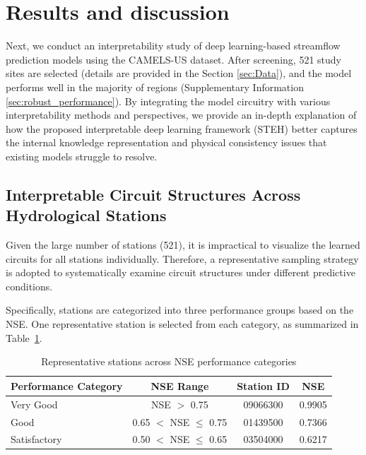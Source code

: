 \section{Results and discussion}
Next, we conduct an interpretability study of deep learning-based streamflow prediction models using the CAMELS-US dataset. After screening, 521 study sites are selected (details are provided in the Section \ref{sec:Data}), and the model performs well in the majority of regions (Supplementary Information \ref{sec:robust_performance}). By integrating the model circuitry with various interpretability methods and perspectives, we provide an in-depth explanation of how the proposed interpretable deep learning framework (STEH) better captures the internal knowledge representation and physical consistency issues that existing models struggle to resolve.

\subsection{Interpretable Circuit Structures Across Hydrological Stations}
Given the large number of stations (521), it is impractical to visualize the learned circuits for all stations individually. Therefore, a representative sampling strategy is adopted to systematically examine circuit structures under different predictive conditions.

Specifically, stations are categorized into three performance groups\cite{Nse} based on the NSE. One representative station is selected from each category, as summarized in Table~\ref{tab:nse_categories}.

\begin{table}[htbp]
    \centering
    \caption{Representative stations across NSE performance categories}
    \label{tab:nse_categories}
    \begin{tabular*}{\textwidth}{@{\extracolsep{\fill}}lccc}
        \toprule
        Performance Category & NSE Range & Station ID & NSE \\
        \midrule
        Very Good     & NSE $>$ 0.75              & 09066300 & 0.9905 \\
        Good          & 0.65 $<$ NSE $\leq$ 0.75 & 01439500 & 0.7366 \\
        Satisfactory  & 0.50 $<$ NSE $\leq$ 0.65 & 03504000 & 0.6217 \\
        \bottomrule
    \end{tabular*}
\end{table}

